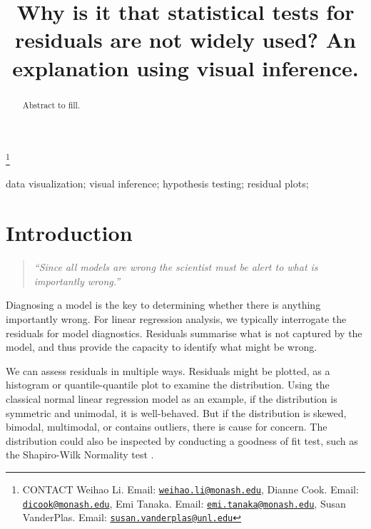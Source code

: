 \documentclass[]{interact}
\theoremstyle{plain}%
\theoremstyle{definition}
\theoremstyle{remark}
\begin{document}

\title{Why is it that statistical tests for residuals are not widely
used? An explanation using visual inference.}


\author{
}

\thanks{CONTACT Weihao
Li. Email: \href{mailto:weihao.li@monash.edu}{\nolinkurl{weihao.li@monash.edu}}, Dianne
Cook. Email: \href{mailto:dicook@monash.edu}{\nolinkurl{dicook@monash.edu}}, Emi
Tanaka. Email: \href{mailto:emi.tanaka@monash.edu}{\nolinkurl{emi.tanaka@monash.edu}}, Susan
VanderPlas. Email: \href{mailto:susan.vanderplas@unl.edu}{\nolinkurl{susan.vanderplas@unl.edu}}}

\maketitle

\begin{abstract}
Abstract to fill.
\end{abstract}

\begin{keywords}
data visualization; visual inference; hypothesis testing; residual
plots;
\end{keywords}

\hypertarget{introduction}{%
\section{Introduction}\label{introduction}}

\begin{quote}
\emph{``Since all models are wrong the scientist must be alert to what
is importantly wrong.''} \citep{box1976science}
\end{quote}

Diagnosing a model is the key to determining whether there is anything
importantly wrong. For linear regression analysis, we typically
interrogate the residuals for model diagnostics. Residuals summarise
what is not captured by the model, and thus provide the capacity to
identify what might be wrong.

We can assess residuals in multiple ways. Residuals might be plotted, as
a histogram or quantile-quantile plot to examine the distribution. Using
the classical normal linear regression model as an example, if the
distribution is symmetric and unimodal, it is well-behaved. But if the
distribution is skewed, bimodal, multimodal, or contains outliers, there
is cause for concern. The distribution could also be inspected by
conducting a goodness of fit test, such as the Shapiro-Wilk Normality
test \citep{shapiro1965analysis}.
\end{document}
